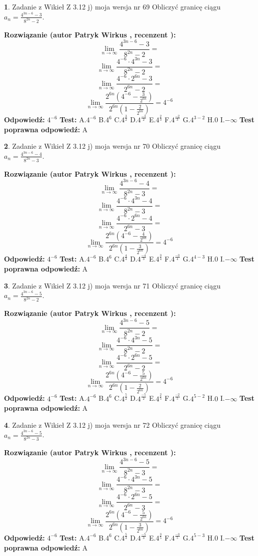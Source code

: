 \documentclass[12pt, a4paper]{article}
\theoremstyle{definition} %
\newtheorem{zad}{}
\newcommand{\zadStart}[1]{\begin{zad}#1\newline}
\newcommand{\zadStop}{\end{zad}}
\newcommand{\rozwStart}[2]{\noindent \textbf{Rozwiązanie (autor #1 , recenzent #2): }\newline}
\newcommand{\rozwStop}{\newline}
\newcommand{\odpStart}{\noindent \textbf{Odpowiedź:}\newline}
\newcommand{\odpStop}{\newline}
\newcommand{\testStart}{\noindent \textbf{Test:}\newline}
\newcommand{\testStop}{\newline}
\newcommand{\kluczStart}{\noindent \textbf{Test poprawna odpowiedź:}\newline}
\newcommand{\kluczStop}{\newline}
\begin{document}
\zadStart{Zadanie z Wikieł Z 3.12 j) moja wersja nr 69}
Obliczyć granicę ciągu $a_{n}=\frac{4^{3n-6}-3}{8^{2n}-2}$.
\zadStop
\rozwStart{Patryk Wirkus}{}
$$\lim\limits_{n\to\infty}\frac{4^{3n-6}-3}{8^{2n}-2}=$$
$$\lim\limits_{n\to\infty}\frac{4^{-6} \cdot 4^{3n}-3}{8^{2n}-2}=$$
$$\lim\limits_{n\to\infty}\frac{4^{-6} \cdot 2^{6n}-3}{2^{6n}-2}=$$
$$\lim\limits_{n\to\infty}\frac{2^{6n}(4^{-6} - \frac{3}{2^{6n}})}{2^{6n}(1-\frac{2}{2^{6n}})}= 4^{-6}$$
\rozwStop
\odpStart
$4^{-6}$
\odpStop
\testStart
A.$4^{-6}$
B.$4^{6}$
C.$4^{\frac{3}{2}}$
D.$4^{\frac{-3}{2}}$
E.$4^{\frac{2}{3}}$
F.$4^{\frac{-2}{3}}$
G.$4^{3-2}$
H.$0$
I.$-\infty$
\testStop
\kluczStart
A
\kluczStop



\zadStart{Zadanie z Wikieł Z 3.12 j) moja wersja nr 70}
Obliczyć granicę ciągu $a_{n}=\frac{4^{3n-6}-4}{8^{2n}-3}$.
\zadStop
\rozwStart{Patryk Wirkus}{}
$$\lim\limits_{n\to\infty}\frac{4^{3n-6}-4}{8^{2n}-3}=$$
$$\lim\limits_{n\to\infty}\frac{4^{-6} \cdot 4^{3n}-4}{8^{2n}-3}=$$
$$\lim\limits_{n\to\infty}\frac{4^{-6} \cdot 2^{6n}-4}{2^{6n}-3}=$$
$$\lim\limits_{n\to\infty}\frac{2^{6n}(4^{-6} - \frac{4}{2^{6n}})}{2^{6n}(1-\frac{3}{2^{6n}})}= 4^{-6}$$
\rozwStop
\odpStart
$4^{-6}$
\odpStop
\testStart
A.$4^{-6}$
B.$4^{6}$
C.$4^{\frac{4}{3}}$
D.$4^{\frac{-4}{3}}$
E.$4^{\frac{3}{4}}$
F.$4^{\frac{-3}{4}}$
G.$4^{4-3}$
H.$0$
I.$-\infty$
\testStop
\kluczStart
A
\kluczStop



\zadStart{Zadanie z Wikieł Z 3.12 j) moja wersja nr 71}
Obliczyć granicę ciągu $a_{n}=\frac{4^{3n-6}-5}{8^{2n}-2}$.
\zadStop
\rozwStart{Patryk Wirkus}{}
$$\lim\limits_{n\to\infty}\frac{4^{3n-6}-5}{8^{2n}-2}=$$
$$\lim\limits_{n\to\infty}\frac{4^{-6} \cdot 4^{3n}-5}{8^{2n}-2}=$$
$$\lim\limits_{n\to\infty}\frac{4^{-6} \cdot 2^{6n}-5}{2^{6n}-2}=$$
$$\lim\limits_{n\to\infty}\frac{2^{6n}(4^{-6} - \frac{5}{2^{6n}})}{2^{6n}(1-\frac{2}{2^{6n}})}= 4^{-6}$$
\rozwStop
\odpStart
$4^{-6}$
\odpStop
\testStart
A.$4^{-6}$
B.$4^{6}$
C.$4^{\frac{5}{2}}$
D.$4^{\frac{-5}{2}}$
E.$4^{\frac{2}{5}}$
F.$4^{\frac{-2}{5}}$
G.$4^{5-2}$
H.$0$
I.$-\infty$
\testStop
\kluczStart
A
\kluczStop



\zadStart{Zadanie z Wikieł Z 3.12 j) moja wersja nr 72}
Obliczyć granicę ciągu $a_{n}=\frac{4^{3n-6}-5}{8^{2n}-3}$.
\zadStop
\rozwStart{Patryk Wirkus}{}
$$\lim\limits_{n\to\infty}\frac{4^{3n-6}-5}{8^{2n}-3}=$$
$$\lim\limits_{n\to\infty}\frac{4^{-6} \cdot 4^{3n}-5}{8^{2n}-3}=$$
$$\lim\limits_{n\to\infty}\frac{4^{-6} \cdot 2^{6n}-5}{2^{6n}-3}=$$
$$\lim\limits_{n\to\infty}\frac{2^{6n}(4^{-6} - \frac{5}{2^{6n}})}{2^{6n}(1-\frac{3}{2^{6n}})}= 4^{-6}$$
\rozwStop
\odpStart
$4^{-6}$
\odpStop
\testStart
A.$4^{-6}$
B.$4^{6}$
C.$4^{\frac{5}{3}}$
D.$4^{\frac{-5}{3}}$
E.$4^{\frac{3}{5}}$
F.$4^{\frac{-3}{5}}$
G.$4^{5-3}$
H.$0$
I.$-\infty$
\testStop
\kluczStart
A
\kluczStop
\end{document}
